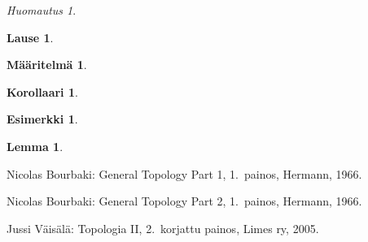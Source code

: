 \documentclass[12pt,a4paper,leqno]{report}
\theoremstyle{plain}
\newtheorem{lause}[equation]{Lause}
\newtheorem{lem}[equation]{Lemma}
\newtheorem{kor}[equation]{Korollaari}
\theoremstyle{definition}
\newtheorem{maar}[equation]{Määritelmä}
\newtheorem{esim}[equation]{Esimerkki}
\theoremstyle{remark}
\newtheorem{huom}[equation]{Huomautus}
\begin{document}
\begin{huom}
\end{huom}
\begin{lause}
\end{lause}
\begin{maar}
\end{maar}
\begin{kor}
\end{kor}
\begin{esim}
\end{esim}
\begin{lem}
\end{lem}
\begin{thebibliography}{9}

Nicolas Bourbaki: General Topology Part 1, 1.\ painos, Hermann, 1966.

Nicolas Bourbaki: General Topology Part 2, 1.\ painos, Hermann, 1966.

%
%
Jussi Väisälä: Topologia II, 2.\ korjattu painos, Limes ry, 2005.



\end{thebibliography}
\end{document}
